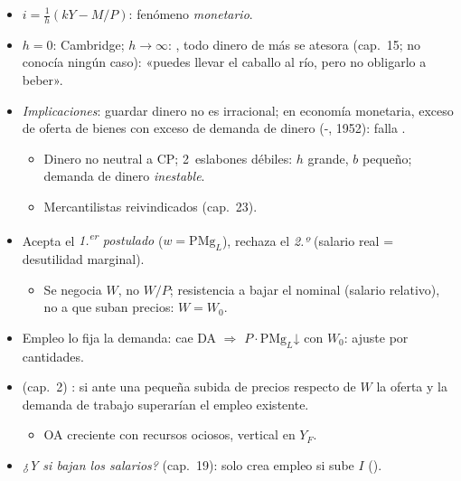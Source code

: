 \documentclass{article}
\begin{document}
\begin{columnas}
\begin{itemize}
\begin{itemize}
  \item $i=\tfrac1h(kY-M/P)$: fenómeno \emph{monetario}.
  \item $h=0$: Cambridge; $h\to\infty$: , todo dinero de más se atesora (cap.~15;  no conocía ningún caso): «puedes llevar el caballo al río, pero no obligarlo a beber».
  \end{itemize}
\end{itemize}
\begin{itemize}
\item \emph{Implicaciones}: guardar dinero no es irracional; en economía monetaria, exceso de oferta de bienes con exceso de demanda de dinero (-, 1952): falla  .
  \begin{itemize}
  \item Dinero no neutral a CP; 2~eslabones débiles: $h$ grande, $b$ pequeño; demanda de dinero \emph{inestable}.
  \item Mercantilistas reivindicados (cap.~23).
  \end{itemize}
\end{itemize}
\begin{itemize}
\item Acepta el \emph{1.\textsuperscript{er} postulado} ($w=\mathrm{PMg}_L$), rechaza el \emph{2.º} (salario real = desutilidad marginal).
  \begin{itemize}
  \item Se negocia $W$, no $W/P$; resistencia a bajar el nominal (salario relativo), no a que suban precios: $W=W_0$.
  \end{itemize}
\item Empleo lo fija la demanda: cae DA $\Rightarrow$ $P\cdot\mathrm{PMg}_L$↓ con $W_0$: ajuste por cantidades.
\item {} (cap.~2) : si ante una pequeña subida de precios respecto de $W$ la oferta y la demanda de trabajo superarían el empleo existente.
  \begin{itemize}
  \item OA creciente con recursos ociosos, vertical en $Y_F$.
  \end{itemize}
\item \emph{¿Y si bajan los salarios?} (cap.~19): solo crea empleo si sube $I$ ().

\end{itemize}
\end{columnas}
\end{document}
